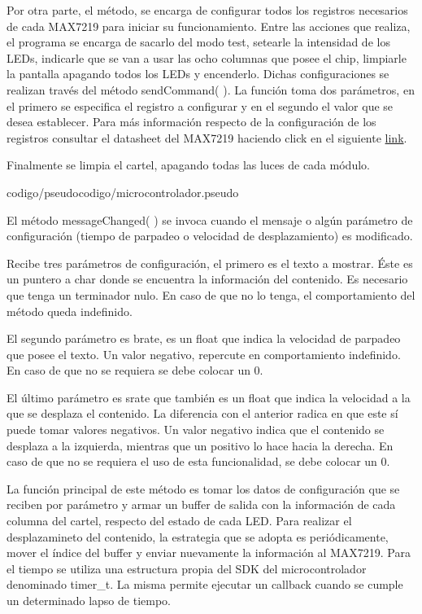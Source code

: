 Por otra parte, el método, se encarga de configurar todos los registros necesarios de cada MAX7219 para iniciar su funcionamiento.
Entre las acciones que realiza, el programa se encarga de sacarlo del modo test, setearle la intensidad de los LEDs, indicarle que se van a usar las ocho columnas que posee el chip, limpiarle la pantalla apagando todos los LEDs y encenderlo.
Dichas configuraciones se realizan través del método sendCommand( ).
La función toma dos parámetros, en el primero se especifica el registro a configurar y en el segundo el valor que se desea establecer.
Para más información respecto de la configuración de los registros consultar el datasheet del MAX7219 haciendo click en el siguiente \href{https://datasheets.maximintegrated.com/en/ds/MAX7219-MAX7221.pdf}{link}.

Finalmente se limpia el cartel, apagando todas las luces de cada módulo.


{codigo/pseudocodigo/microcontrolador.pseudo}

El método messageChanged( ) se invoca cuando el mensaje o algún parámetro de configuración (tiempo de parpadeo o velocidad de desplazamiento) es modificado.

Recibe tres parámetros de configuración, el primero es el texto a mostrar.
Éste es un puntero a char donde se encuentra la información del contenido.
Es necesario que tenga un terminador nulo.
En caso de que no lo tenga, el comportamiento del método queda indefinido.

El segundo parámetro es brate, es un float que indica la velocidad de parpadeo que posee el texto.
Un valor negativo, repercute en comportamiento indefinido.
En caso de que no se requiera se debe colocar un 0.

El último parámetro es srate que también es un float que indica la velocidad a la que se desplaza el contenido.
La diferencia con el anterior radica en que este sí puede tomar valores negativos.
Un valor negativo indica que el contenido se desplaza a la izquierda, mientras que un positivo lo hace hacia la derecha.
En caso de que no se requiera el uso de esta funcionalidad, se debe colocar un 0. 

La función principal de este método es tomar los datos de configuración que se reciben por parámetro y armar un buffer de salida con la información de cada columna del cartel, respecto del estado de cada LED.
Para realizar el desplazamineto del contenido, la estrategia que se adopta es periódicamente, mover el índice del buffer y enviar nuevamente la información al MAX7219.
Para el tiempo se utiliza una estructura propia del SDK del microcontrolador denominado timer\_t.
La misma permite ejecutar un callback cuando se cumple un determinado lapso de tiempo.

